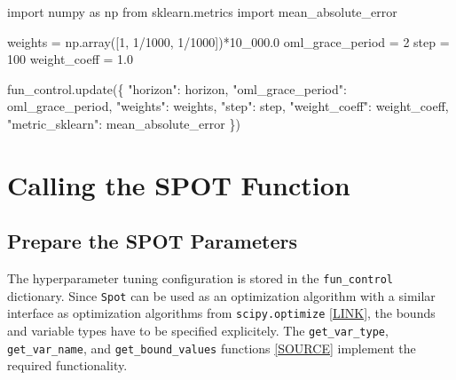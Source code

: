 \documentclass[
  letterpaper,
  DIV=11,
  numbers=noendperiod]{scrreprt}
\newenvironment{Shaded}{\begin{snugshade}}{\end{snugshade}}
\newcommand{\DecValTok}[1]{\textcolor[rgb]{0.68,0.00,0.00}{#1}}
\newcommand{\FloatTok}[1]{\textcolor[rgb]{0.68,0.00,0.00}{#1}}
\newcommand{\ImportTok}[1]{\textcolor[rgb]{0.00,0.46,0.62}{#1}}
\newcommand{\NormalTok}[1]{\textcolor[rgb]{0.00,0.23,0.31}{#1}}
\newcommand{\OperatorTok}[1]{\textcolor[rgb]{0.37,0.37,0.37}{#1}}
\newcommand{\StringTok}[1]{\textcolor[rgb]{0.13,0.47,0.30}{#1}}
\begin{document}
\begin{Shaded}
\begin{Highlighting}[]
\ImportTok{import}\NormalTok{ numpy }\ImportTok{as}\NormalTok{ np}
\ImportTok{from}\NormalTok{ sklearn.metrics }\ImportTok{import}\NormalTok{ mean\_absolute\_error}

\NormalTok{weights }\OperatorTok{=}\NormalTok{ np.array([}\DecValTok{1}\NormalTok{, }\DecValTok{1}\OperatorTok{/}\DecValTok{1000}\NormalTok{, }\DecValTok{1}\OperatorTok{/}\DecValTok{1000}\NormalTok{])}\OperatorTok{*}\FloatTok{10\_000.0}
\NormalTok{oml\_grace\_period }\OperatorTok{=} \DecValTok{2}
\NormalTok{step }\OperatorTok{=} \DecValTok{100}
\NormalTok{weight\_coeff }\OperatorTok{=} \FloatTok{1.0}

\NormalTok{fun\_control.update(\{}
               \StringTok{"horizon"}\NormalTok{: horizon,}
               \StringTok{"oml\_grace\_period"}\NormalTok{: oml\_grace\_period,}
               \StringTok{"weights"}\NormalTok{: weights,}
               \StringTok{"step"}\NormalTok{: step,}
               \StringTok{"weight\_coeff"}\NormalTok{: weight\_coeff,}
               \StringTok{"metric\_sklearn"}\NormalTok{: mean\_absolute\_error}
\NormalTok{               \})}
\end{Highlighting}
\end{Shaded}

\hypertarget{calling-the-spot-function}{%
\section{Calling the SPOT Function}\label{calling-the-spot-function}}

\hypertarget{prepare-the-spot-parameters}{%
\subsection{Prepare the SPOT
Parameters}\label{prepare-the-spot-parameters}}

The hyperparameter tuning configuration is stored in the
\texttt{fun\_control} dictionary. Since \texttt{Spot} can be used as an
optimization algorithm with a similar interface as optimization
algorithms from \texttt{scipy.optimize}
\href{https://docs.scipy.org/doc/scipy/reference/optimize.html\#module-scipy.optimize}{{[}LINK{]}},
the bounds and variable types have to be specified explicitely. The
\texttt{get\_var\_type}, \texttt{get\_var\_name}, and
\texttt{get\_bound\_values} functions
\href{https://github.com/sequential-parameter-optimization/spotPython/blob/main/src/spotPython/hyperparameters/values.py}{{[}SOURCE{]}}
implement the required functionality.
\end{document}
